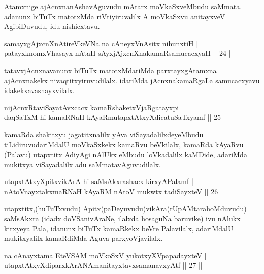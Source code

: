 \begin{artha}
Atamxnige ajAcnxnanAshavAguvudu mAtarx moVkaSxveMbudu saMmata. adanunx biTuTx matotxMda riVtiyiruvalilx A moVkaSxvu anitayxveV AgibiDuvudu, idu nishicxtavu.
\end{artha}

\begin{shl}
samayxgAjxcnXnAtireVkeVNa na cAneyxVnAsitx nihunxtiH |\\
patayxknomxVhasayx nAtaH sAyxjAjxcnXnakamaRsamucacxyaH \hfill || 24 ||
\end{shl}

\begin{artha}
tatavxjAcnxnavanunx biTuTx matotxMdariMda parxtayxgAtamxna ajAcnxnakekx nivaqtitxyiruvudilalx. idariMda jAcnxnakamaRgaLa samucacxyavu idakekx\break avashayxvilalx.
\end{artha}

\begin{shl}
nijAcnxRtaviSayatAvxcacx kamaRshaketxVjaRgatayxpi |\\
daqSaTxM hi kamaRNaH kAyaRmutapxtAtxyXdicatuSaTxyamf \hfill || 25 ||
\end{shl}

\begin{artha}
kamaRda shakitxyu jagatitxnalilx yAva viSayadalilxdeyeMbudu tiLidiruvudariMdalU moVkaSxkekx kamaRvu beVkilalx, kamaRda kAyaRvu (Palavu) utapxtitx AdiyAgi nAlUkx eMbudu loVkadalilx kaMDide, adariMda mukitxya viSayadalilx adu saMmatavAguvudilalx.
\end{artha}


\begin{shl}
utapxtAtxyXpitxvikArA hi saMsAkxrashacx kirxyAPalamf |\\
nAtoV\s nayxtakxmaRNaH kAyaRM nAtoV mukwtx tadiSayxteV \hfill || 26 ||
\end{shl}

\begin{artha}
utapxtitx,(huTuTxvudu) Apitx(paDeyuvudu)vikAra(rUpAMtara\break hoMduvudu) saMsAkxra (idadx doVSanivAraNe, ilalxda hosaguNa baruvike) ivu nAlukx kirxyeya Pala, idanunx biTuTx kamaRkekx beVre Palavilalx, adariMdalU mukitxyalilx kamaRdiMda Aguva parxyoVjavilalx.
\end{artha}

\begin{shl}
na cAnayxtama EteVSAM moVkoSxV yukotxyXVpapadayxteV |\\
utapxtAtxyXdiparxkArANAmanitayxtavxsamanavxyAtf \hfill ||  27 ||
\end{shl}

